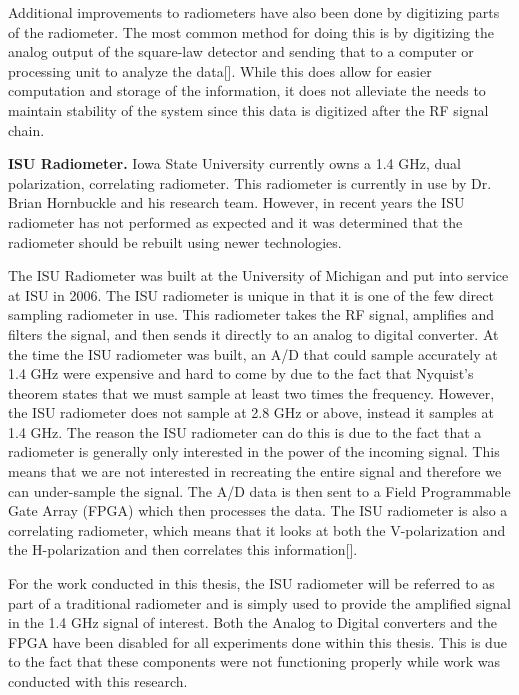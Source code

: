 Additional improvements to radiometers have also been done by digitizing parts of the radiometer.  The most common method for doing this is by digitizing the analog output of the square-law detector and sending that to a computer or processing unit to analyze the data[\cite{Bremer}].  While this does allow for easier computation and storage of the information, it does not alleviate the needs to maintain stability of the system since this data is digitized after the RF signal chain.

\textbf{ISU Radiometer.}  Iowa State University currently owns a 1.4 GHz, dual polarization, correlating radiometer.  This radiometer is currently in use by Dr. Brian Hornbuckle and his research team.  However, in recent years the ISU radiometer has not performed as expected and it was determined that the radiometer should be rebuilt using newer technologies.  

The ISU Radiometer was built at the University of Michigan and put into service at ISU in 2006.  The ISU radiometer is unique in that it is one of the few direct sampling radiometer in use\cite{Erbas}.  This radiometer takes the RF signal, amplifies and filters the signal, and then sends it directly to an analog to digital converter.  At the time the ISU radiometer was built, an A/D that could sample accurately at 1.4 GHz were expensive and hard to come by due to the fact that Nyquist's theorem states that we must sample at least two times the frequency.  However, the ISU radiometer does not sample at 2.8 GHz or above, instead it samples at 1.4 GHz.  The reason the ISU radiometer can do this is due to the fact that a radiometer is generally only interested in the power of the incoming signal.  This means that we are not interested in recreating the entire signal and therefore we can under-sample the signal.  The A/D data is then sent to a Field Programmable Gate Array (FPGA) which then processes the data.  The ISU radiometer is also a correlating radiometer, which means that it looks at both the V-polarization and the H-polarization and then correlates this information[\cite{Fischman2001}]. 

For the work conducted in this thesis, the ISU radiometer will be referred to as part of a traditional radiometer and is simply used to provide the amplified signal in the 1.4 GHz signal of interest.  Both the Analog to Digital converters and the FPGA have been disabled for all experiments done within this thesis.  This is due to the fact that these components were not functioning properly while work was conducted with this research.

